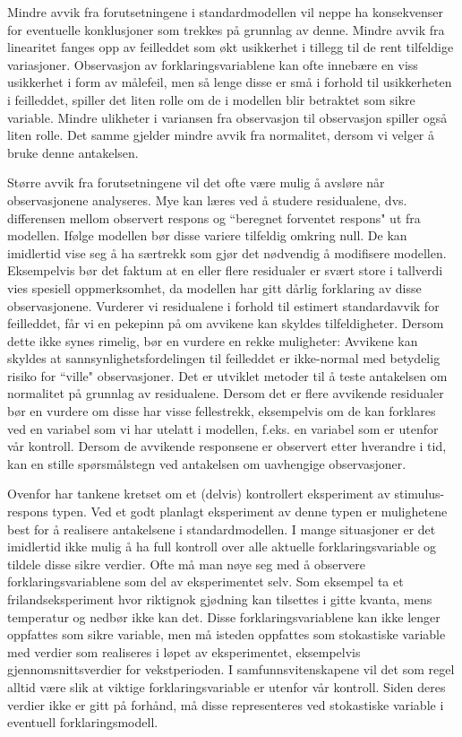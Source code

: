 Mindre avvik fra forutsetningene i standardmodellen vil neppe ha
konsekvenser for eventuelle konklusjoner som trekkes på grunnlag av
denne.  Mindre avvik fra linearitet fanges opp av feilleddet som økt 
usikkerhet i tillegg til de rent tilfeldige variasjoner.  Observasjon av
forklaringsvariablene kan ofte innebære en viss usikkerhet i form av
målefeil, men så lenge disse er små i forhold til 
usikkerheten i feilleddet, spiller det liten rolle om de i modellen blir
betraktet som sikre variable.  Mindre ulikheter i variansen fra
observasjon til observasjon spiller også liten rolle.  Det samme gjelder
mindre avvik fra normalitet, dersom vi velger å bruke denne antakelsen.

Større avvik fra forutsetningene vil det ofte være mulig å
avsløre når observasjonene analyseres.  Mye kan læres ved å
studere residualene, dvs. differensen mellom observert respons og 
``beregnet forventet respons" ut fra modellen.  Ifølge modellen bør
disse variere tilfeldig omkring null.  De kan imidlertid vise seg å
ha særtrekk som gjør det nødvendig å modifisere modellen. 
Eksempelvis bør det faktum at en eller flere residualer er svært
store i tallverdi vies spesiell oppmerksomhet, da modellen har gitt 
dårlig forklaring av disse observasjonene.  Vurderer vi residualene 
i forhold til estimert standardavvik for feilleddet, får vi en pekepinn
på om avvikene kan skyldes tilfeldigheter.  Dersom dette ikke synes
rimelig, bør en vurdere en rekke muligheter:  Avvikene kan skyldes at
sannsynlighetsfordelingen til feilleddet er ikke-normal med betydelig 
risiko for ``ville" observasjoner.  Det er utviklet metoder til å teste
antakelsen om normalitet på grunnlag av residualene.  Dersom det er
flere avvikende residualer bør en vurdere om disse har visse fellestrekk,
eksempelvis om de kan forklares ved en variabel som vi har utelatt i 
modellen, f.eks. en variabel som er utenfor vår kontroll.  Dersom de
avvikende responsene er observert etter hverandre i tid, kan en stille 
spørsmålstegn ved antakelsen om uavhengige observasjoner.

Ovenfor har tankene kretset om et (delvis) kontrollert eksperiment av
stimulus-respons typen.  Ved et godt planlagt eksperiment av denne typen er
mulighetene best for å realisere antakelsene i standardmodellen.  I
mange situasjoner er det imidlertid ikke mulig å ha full kontroll over
alle aktuelle forklaringsvariable og tildele disse sikre verdier.  Ofte må
man nøye seg med å observere forklaringsvariablene som del av
eksperimentet selv.  Som eksempel ta et frilandseksperiment hvor riktignok
gjødning kan tilsettes i gitte kvanta, mens temperatur og nedbør ikke
kan det.  Disse forkla\-rings\-variablene kan ikke lenger oppfattes som sikre
variable, men må isteden oppfattes som stokastiske variable med verdier
som realiseres i løpet av eksperimentet, eksempelvis gjennomsnittsverdier
for vekstperioden.  I samfunnsvitenskapene vil det som regel alltid være
slik at viktige forkla\-rings\-variable er utenfor vår kontroll.  Siden deres
verdier ikke er gitt på forhånd, må disse representeres ved
stokastiske variable i eventuell forkla\-rings\-modell.

